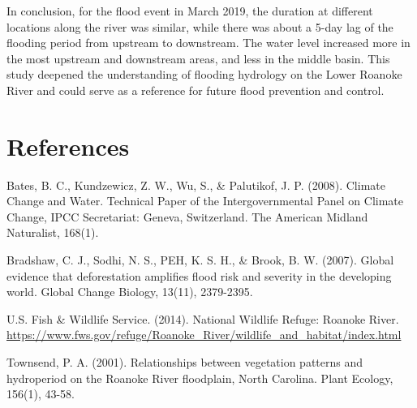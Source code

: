 \documentclass[12pt,]{article}
\begin{document}
In conclusion, for the flood event in March 2019, the duration at
different locations along the river was similar, while there was about a
5-day lag of the flooding period from upstream to downstream. The water
level increased more in the most upstream and downstream areas, and less
in the middle basin. This study deepened the understanding of flooding
hydrology on the Lower Roanoke River and could serve as a reference for
future flood prevention and control.

\newpage

\section{References}\label{references}

Bates, B. C., Kundzewicz, Z. W., Wu, S., \& Palutikof, J. P. (2008).
Climate Change and Water. Technical Paper of the Intergovernmental Panel
on Climate Change, IPCC Secretariat: Geneva, Switzerland. The American
Midland Naturalist, 168(1).

Bradshaw, C. J., Sodhi, N. S., PEH, K. S. H., \& Brook, B. W. (2007).
Global evidence that deforestation amplifies flood risk and severity in
the developing world. Global Change Biology, 13(11), 2379-2395.

U.S. Fish \& Wildlife Service. (2014). National Wildlife Refuge: Roanoke
River.
\url{https://www.fws.gov/refuge/Roanoke_River/wildlife_and_habitat/index.html}

Townsend, P. A. (2001). Relationships between vegetation patterns and
hydroperiod on the Roanoke River floodplain, North Carolina. Plant
Ecology, 156(1), 43-58.
\end{document}
